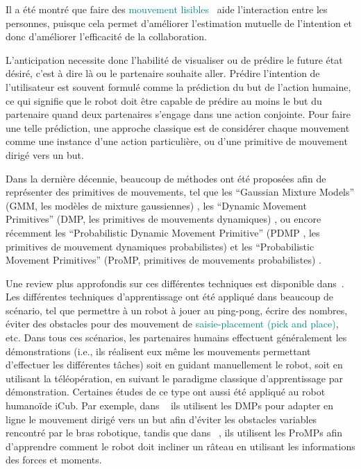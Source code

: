 \documentclass[utf8]{frontiersSCNS} %
\newcommand{\rev}[1]{\textcolor{blue}{#1}}
\newcommand{\ori}[1]{\textcolor{teal}{#1}}
\newcommand{\toimprove}[1]{\textcolor{teal}{#1}}
\begin{document}

Il a été montré que faire des \ori{mouvement lisibles}~\citep{Busch2017,Dragan2013rss} aide l'interaction entre les personnes, puisque cela permet d'améliorer l'estimation mutuelle de l'intention et donc d'améliorer l'efficacité de la collaboration.

L'anticipation necessite donc l’habilité de visualiser ou de prédire le future état désiré, c'est à dire là ou le partenaire souhaite aller.
Prédire l'intention de l'utilisateur est souvent formulé comme la prédiction du but de l'action humaine, ce qui signifie que le robot doit être capable de prédire au moins le but du partenaire quand deux partenaires s'engage dans une action conjointe. Pour faire une telle prédiction, une approche classique est de considérer chaque mouvement comme une instance d'une action particulière, ou d'une primitive de mouvement dirigé vers un but.

Dans la dernière décennie, beaucoup de méthodes ont été proposées afin de représenter des primitives de mouvements, tel que les  ``Gaussian Mixture Models'' (GMM, les modèles de mixture gaussiennes) \citep{Calinon2014,khansari2011learning}, les ``Dynamic Movement Primitives'' (DMP, les primitives de mouvements dynamiques) \citep{ijspeert2013dynamical}, ou encore récemment les ``Probabilistic Dynamic Movement Primitive'' (PDMP \cite{meier2016probabilistic}, les primitives de mouvement dynamiques probabilistes) et les ``Probabilistic Movement Primitives'' (ProMP, primitives de mouvements probabilistes) \citep{paraschos2013probabilistic}.

Une review plus approfondis sur ces différentes techniques est disponible dans~\citep{HandbookRobotLearning}.
Les différentes techniques d'apprentissage ont été appliqué dans beaucoup de scénario, tel que permettre à un robot à jouer au ping-pong, écrire des nombres, éviter des obstacles pour des mouvement de \toimprove{saisie-placement (pick and place)}, etc. Dans tous ces scénarios, les partenaires humains effectuent généralement les démonstrations (i.e., ils réalisent eux même les mouvements permettant d'effectuer les différentes tâches) soit en guidant manuellement le robot, soit en utilisant la téléopération, en suivant le paradigme classique d'apprentissage par démonstration.
Certaines études de ce type ont aussi été appliqué au robot humanoïde iCub. Par exemple, dans ~\cite{2013ACTI2891} ils utilisent les DMPs pour adapter en ligne le mouvement dirigé vers un but afin d’éviter les obstacles variables rencontré par le bras robotique, tandis que dans~ \cite{paraschos2015model}, ils utilisent les ProMPs afin d'apprendre comment le robot doit incliner un râteau en utilisant les informations des forces et moments.
\end{document}
